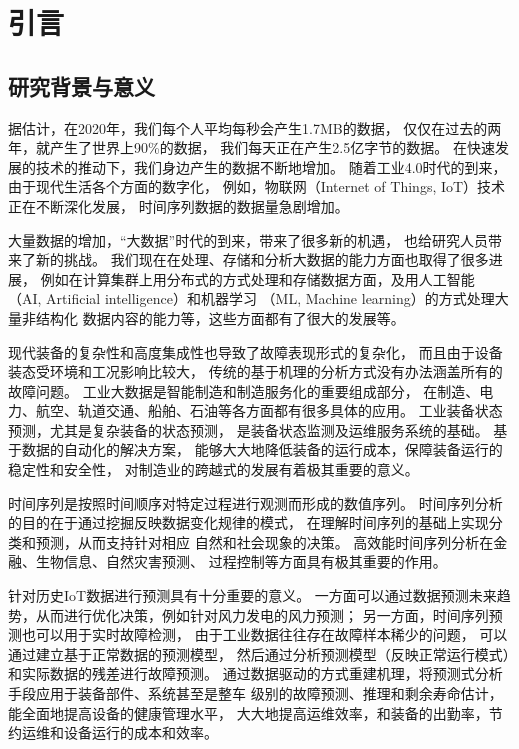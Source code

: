 
\chapter{引言}\label{chapter1}

\section{研究背景与意义}
据估计，在2020年，我们每个人平均每秒会产生1.7MB的数据，
仅仅在过去的两年，就产生了世界上90\%的数据，
我们每天正在产生2.5亿字节的数据\cite{siegel2013predictive}。
在快速发展的技术的推动下，我们身边产生的数据不断地增加。
随着工业4.0时代的到来，由于现代生活各个方面的数字化，
例如，物联网（Internet of Things, IoT）技术正在不断深化发展，
时间序列数据的数据量急剧增加。

大量数据的增加，“大数据”时代的到来，带来了很多新的机遇，
也给研究人员带来了新的挑战。
我们现在在处理、存储和分析大数据的能力方面也取得了很多进展，
例如在计算集群上用分布式的方式处理和存储数据方面，及用人工智能
（AI, Artificial intelligence）和机器学习
（ML, Machine learning）的方式处理大量非结构化
数据内容的能力等，这些方面都有了很大的发展等。

现代装备的复杂性和高度集成性也导致了故障表现形式的复杂化，
而且由于设备装态受环境和工况影响比较大，
传统的基于机理的分析方式没有办法涵盖所有的故障问题。
工业大数据是智能制造和制造服务化的重要组成部分，
在制造、电力、航空、轨道交通、船舶、石油等各方面都有很多具体的应用。
工业装备状态预测，尤其是复杂装备的状态预测，
是装备状态监测及运维服务系统的基础。
基于数据的自动化的解决方案，
能够大大地降低装备的运行成本，保障装备运行的稳定性和安全性，
对制造业的跨越式的发展有着极其重要的意义。

时间序列是按照时间顺序对特定过程进行观测而形成的数值序列。
时间序列分析的目的在于通过挖掘反映数据变化规律的模式，
在理解时间序列的基础上实现分类和预测，从而支持针对相应
自然和社会现象的决策。
高效能时间序列分析在金融、生物信息、自然灾害预测、
过程控制等方面具有极其重要的作用。

针对历史IoT数据进行预测具有十分重要的意义。
一方面可以通过数据预测未来趋势，从而进行优化决策，例如针对风力发电的风力预测；
另一方面，时间序列预测也可以用于实时故障检测，
由于工业数据往往存在故障样本稀少的问题，
可以通过建立基于正常数据的预测模型，
然后通过分析预测模型（反映正常运行模式）和实际数据的残差进行故障预测。
通过数据驱动的方式重建机理，将预测式分析手段应用于装备部件、系统甚至是整车
级别的故障预测、推理和剩余寿命估计，能全面地提高设备的健康管理水平，
大大地提高运维效率，和装备的出勤率，节约运维和设备运行的成本和效率。

